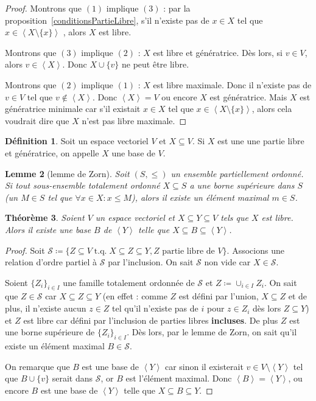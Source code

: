 \documentclass{article}
\DeclareMathOperator{\tq}{\text{ t.q. }}
\newcommand{\eng}[1]{\left\langle#1\right\rangle}
\newtheorem{thm}{Théorème}[section]
\newtheorem{lem}[thm]{Lemme}
\theoremstyle{definition}
\newtheorem{déf}[thm]{Définition}
\theoremstyle{remark}
\begin{document}
		\begin{proof} Montrons que $(1)$ implique $(3)$ : par la proposition~\ref{conditionsPartieLibre}, s'il n'existe pas de $x \in X$ tel que
		$x \in \eng {X \setminus \{x\}}$ , alors $X$ est libre.

		Montrons que $(3)$ implique $(2)$ : $X$ est libre et génératrice. Dès lors, si $v \in V$, alors $v \in \eng X$. Donc $X \cup \{v\}$ ne peut être libre.

		Montrons que $(2)$ implique $(1)$ : $X$ est libre maximale. Donc il n'existe pas de $v \in V$ tel que $v \not \in \eng X$. Donc $\eng X = V$ ou encore $X$ est
		génératrice. Mais $X$ est génératrice minimale car s'il existait $x \in X$ tel que $x \in \eng {X \setminus \{x\}}$, alors cela voudrait dire que $X$ n'est pas libre
		maximale. \end{proof}

		\begin{déf} Soit un espace vectoriel $V$ et $X \subseteq V$. Si $X$ est une une partie libre et génératrice, on appelle $X$ une base de $V$. \end{déf}

		\begin{lem}[lemme de Zorn] Soit $(S, \leq)$ un ensemble partiellement ordonné. Si tout sous-ensemble totalement ordonné $X \subseteq S$ a une borne supérieure dans
		$S$ (un $M \in S$ tel que $\forall x \in X : x \leq M$), alors il existe un élément maximal $m \in S$. \end{lem}

		\begin{thm}\label{existenceBaseEspaceGénéré} Soient $V$ un espace vectoriel et $X \subseteq Y \subseteq V$ tels que $X$ est libre. Alors il existe une base
		$B$ de $\eng Y$ telle que $X \subseteq B \subseteq \eng Y$. \end{thm}

		\begin{proof} Soit $\mathcal S \coloneqq \{Z \subseteq V \tq X \subseteq Z \subseteq Y, Z \text{ partie libre de } V\}$. Associons une relation d'ordre partiel
		à $\mathcal S$ par l'inclusion. On sait $\mathcal S$ non vide car $X \in \mathcal S$.

		Soient $\{Z_i\}_{i \in I}$ une famille totalement ordonnée de $\mathcal S$ et $Z \coloneqq \cup_{i \in I}Z_i$. On sait que $Z \in \mathcal S$ car
		$X \subseteq Z \subseteq Y$ (en effet : comme $Z$ est défini par l'union, $X \subseteq Z$ et de plus, il n'existe aucun $z \in Z$ tel qu'il n'existe pas de $i$ pour
		$z \in Z_i$ dès lors $Z \subseteq Y$) et $Z$ est libre car défini par l'inclusion de parties libres \textbf{incluses}. De plus $Z$ est une borne supérieure de
		$\{Z_i\}_{i \in I}$. Dès lors, par le lemme de Zorn, on sait qu'il existe un élément maximal $B \in \mathcal S$.

		On remarque que $B$ est une base de $\eng Y$ car sinon il existerait $v \in V \setminus \eng Y$ tel que $B \cup \{v\}$ serait dans $\mathcal S$, or $B$ est l'élément
		maximal. Donc $\eng B = \eng Y$, ou encore $B$ est une base de $\eng Y$ telle que $X \subseteq B \subseteq Y$. \end{proof}
\end{document}
